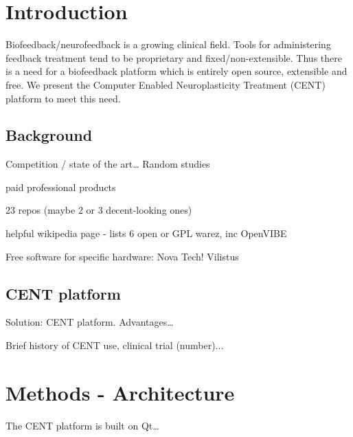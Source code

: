 \documentclass[fleqn,10pt]{wlpeerj}
\begin{document}
\section{Introduction}

Biofeedback/neurofeedback is a growing clinical field. Tools for administering feedback treatment tend to be proprietary and fixed/non-extensible. Thus there is a need for a biofeedback platform which is entirely open source, extensible and free. We present the Computer Enabled Neuroplasticity Treatment (CENT) platform to meet this need.


\subsection{Background}

Competition / state of the art…
Random studies

paid professional products

23 repos (maybe 2 or 3 decent-looking ones)

helpful wikipedia page - lists 6 open or GPL warez, inc OpenVIBE

Free software for specific hardware:
Nova Tech!
Vilistus


\subsection{CENT platform}
Solution: CENT platform. Advantages…

Brief history of CENT use, clinical trial (number)...






\section{Methods - Architecture}
The CENT platform is built on Qt…
\end{document}

